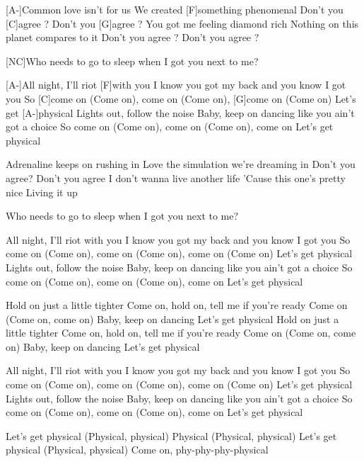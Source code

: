 
[A-]Common love isn't for us
We created [F]something phenomenal
Don't you [C]agree ?
Don't you [G]agree ?
You got me feeling diamond rich
Nothing on this planet compares to it
Don't you agree ?
Don't you agree ?

[NC]Who needs to go to sleep when I got you next to me?

[A-]All night, I'll riot [F]with you
I know you got my back and you know I got you
So [C]come on (Come on), come on (Come on), [G]come on (Come on)
Let's get [A-]physical
Lights out, follow the noise
Baby, keep on dancing like you ain't got a choice
So come on (Come on), come on (Come on), come on
Let's get physical

Adrenaline keeps on rushing in
Love the simulation we're dreaming in
Don't you agree?
Don't you agree
I don't wanna live another life
'Cause this one's pretty nice
Living it up

Who needs to go to sleep when I got you next to me?

All night, I'll riot with you
I know you got my back and you know I got you
So come on (Come on), come on (Come on), come on (Come on)
Let's get physical
Lights out, follow the noise
Baby, keep on dancing like you ain't got a choice
So come on (Come on), come on (Come on), come on
Let's get physical

Hold on just a little tighter
Come on, hold on, tell me if you're ready
Come on (Come on, come on)
Baby, keep on dancing
Let's get physical
Hold on just a little tighter
Come on, hold on, tell me if you're ready
Come on (Come on, come on)
Baby, keep on dancing
Let's get physical

All night, I'll riot with you
I know you got my back and you know I got you
So come on (Come on), come on (Come on), come on (Come on)
Let's get physical
Lights out, follow the noise
Baby, keep on dancing like you ain't got a choice
So come on (Come on), come on (Come on), come on
Let's get physical

Let's get physical (Physical, physical)
Physical (Physical, physical)
Let's get physical (Physical, physical)
Come on, phy-phy-phy-physical

